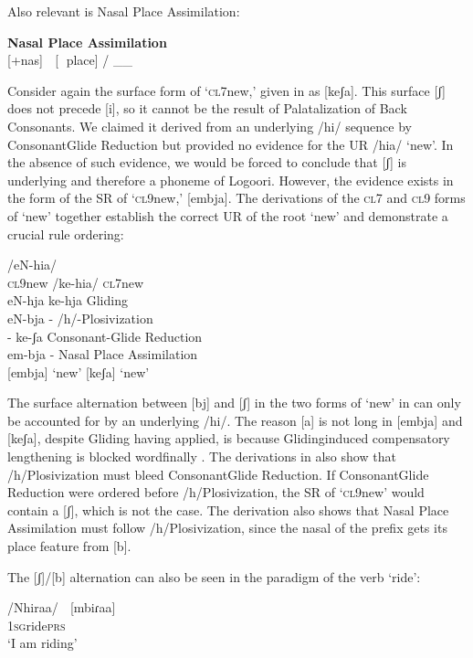 \documentclass[output=paper]{langsci/langscibook}
\begin{document}
Also relevant is Nasal Place Assimilation:


\ea{}
\textbf{Nasal Place Assimilation} \citep[116]{Leung1991}\\{}
[+nas]  [ place] / \_\_ 
\z



Consider again the surface form of ‘\textsc{cl}7new,’ given in  as [keʃa]. This surface [ʃ] does not precede [i], so it cannot be the result of Palatalization of Back Consonants. We claimed it derived from an underlying /hi/ sequence by ConsonantGlide Reduction but provided no evidence for the UR /hia/ ‘new’. In the absence of such evidence, we would be forced to conclude that [ʃ] is underlying and therefore a phoneme of Logoori. However, the evidence exists in the form of the SR of ‘\textsc{cl}9new,’ [embja]. The derivations of the \textsc{cl}7 and \textsc{cl}9 forms of ‘new’ together establish the correct UR of the root ‘new’ and demonstrate a crucial rule ordering:


\ea{}
/eN-hia/ \\{}
 \textsc{cl9}new  /ke-hia/  \textsc{cl7}new\\{}
eN-hja      ke-hja        Gliding\\{}
eN-bja      {}-        /h/-Plosivization\\{}
{}-        ke-ʃa        Consonant-Glide Reduction\\{}
em-bja      {}-        Nasal Place Assimilation\\{}
[embja]  ‘new’    [keʃa]     ‘new’
\z


The surface alternation between [bj] and [ʃ] in the two forms of ‘new’ in  can only be accounted for by an underlying /hi/. The reason [a] is not long in [embja] and [keʃa], despite Gliding having applied, is because Glidinginduced compensatory lengthening is blocked wordfinally \citep{Leung1991}. The derivations in  also show that /h/Plosivization must bleed ConsonantGlide Reduction. If ConsonantGlide Reduction were ordered before /h/Plosivization, the SR of ‘\textsc{cl}9new’ would contain a [ʃ], which is not the case. The derivation also shows that Nasal Place Assimilation must follow /h/Plosivization, since the nasal of the prefix gets its place feature from [b].

The [ʃ]/[b] alternation can also be seen in the paradigm of the verb ‘ride’:


\ea{}
 /Nhiraa/    [mbiɾaa]\\{}
\textsc{1sg}ride\textsc{prs}\\{}
\glt ‘I am riding’
\z
\end{document}
